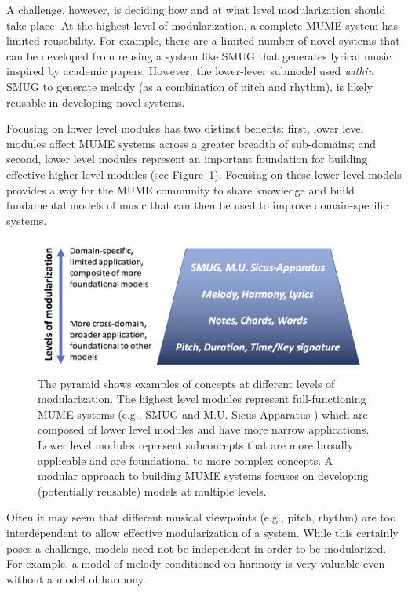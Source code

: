 \documentclass[letterpaper]{article}
\begin{document}
A challenge, however, is deciding how and at what level modularization should take place. At the highest level of modularization, a complete MUME system has limited reusability. For example, there are a limited number of novel systems that can be developed from reusing a system like SMUG \cite{scirea2015smug} that generates lyrical music inspired by academic papers. However, the lower-lever submodel used \emph{within} SMUG to generate melody (as a combination of pitch and rhythm), is likely reusable in developing novel systems.

Focusing on lower level modules has two distinct benefits: first, lower level modules affect MUME systems across a greater breadth of sub-domains; and second, lower level modules represent an important foundation for building effective higher-level modules (see Figure~\ref{fig:modularization_levels}). Focusing on these lower level models provides a way for the MUME community to share knowledge and build fundamental models of music that can then be used to improve domain-specific systems. 

\begin{figure}
	\centering
	\includegraphics[width=\linewidth]{modularization_levels_gradient}
	\caption{\label{fig:modularization_levels} The pyramid shows examples of concepts at different levels of modularization. The highest level modules represent full-functioning MUME systems (e.g., SMUG \cite{scirea2015smug} and M.U. Sicus-Apparatus \cite{toivanen2013automatical}) which are composed of lower level modules and have more narrow applications. Lower level modules represent subconcepts that are more broadly applicable and are foundational to more complex concepts. A modular approach to building MUME systems focuses on developing (potentially reusable) models at multiple levels.}
\end{figure}

Often it may seem that different musical viewpoints (e.g., pitch, rhythm) are too interdependent to allow effective modularization of a system. While this certainly poses a challenge, models need not be independent in order to be modularized. For example, a model of melody conditioned on harmony is very valuable even without a model of harmony.
\end{document}
